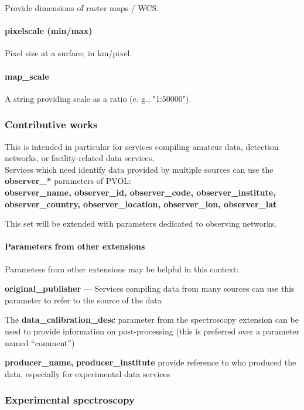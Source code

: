 \documentclass[11pt,a4paper]{ivoa}
\begin{document}
Provide dimensions of raster maps / WCS.

\paragraph{pixelscale (min/max)}

Pixel size at a surface, in km/pixel.

\paragraph{map\_scale}
A string providing scale as a ratio (e. g., "1:50000").

\subsubsection{Contributive works}

This is intended in particular for services compiling amateur data,
detection networks, or facility-related data services.\\
Services which need identify data
provided by multiple sources can use the
\textbf{observer\_* }parameters of PVOL: \\
\textbf{observer\_name, observer\_id, observer\_code,
observer\_institute, observer\_country,
observer\_location, observer\_lon, observer\_lat}

This set will be extended with parameters dedicated to observing networks.

\paragraph{Parameters from other extensions}

Parameters from other extensions may be helpful in this context:

\textbf{original\_publisher} --- Services compiling data from many sources
can use this\textbf{ }parameter to refer to the source of the data

The\textbf{ \textbf{data\_calibration\_desc}} parameter from
the spectroscopy extension can be used to provide information on
post-processing (this is preferred over a parameter named ``comment'')

\textbf{producer\_name, }\textbf{producer\_institute }provide reference
to who produced the data, especially for experimental data services

\subsubsection{Experimental spectroscopy}
\end{document}

